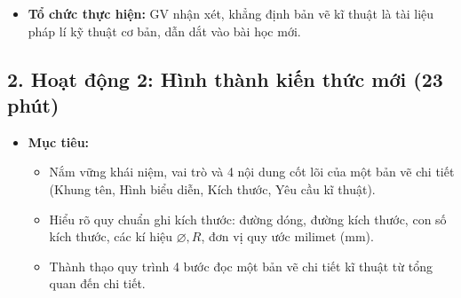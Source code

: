 \documentclass[12pt, a4paper]{article}
\begin{document}
\begin{itemize}[leftmargin=1.2cm]
    \item[d)] \textbf{Tổ chức thực hiện:} GV nhận xét, khẳng định bản vẽ kĩ thuật là tài liệu pháp lí kỹ thuật cơ bản, dẫn dắt vào bài học mới.
\end{itemize}

\subsection*{2. Hoạt động 2: Hình thành kiến thức mới (23 phút)}

\begin{itemize}[leftmargin=1.2cm]
    \item[a)] \textbf{Mục tiêu:}
    \begin{itemize}[leftmargin=0.6cm]
        \item Nắm vững khái niệm, vai trò và 4 nội dung cốt lõi của một bản vẽ chi tiết (Khung tên, Hình biểu diễn, Kích thước, Yêu cầu kĩ thuật).
        \item Hiểu rõ quy chuẩn ghi kích thước: đường dóng, đường kích thước, con số kích thước, các kí hiệu $\varnothing, R$, đơn vị quy ước milimet ($\text{mm}$).
        \item Thành thạo quy trình 4 bước đọc một bản vẽ chi tiết kĩ thuật từ tổng quan đến chi tiết.
    \end{itemize}


\end{itemize}
\end{document}
